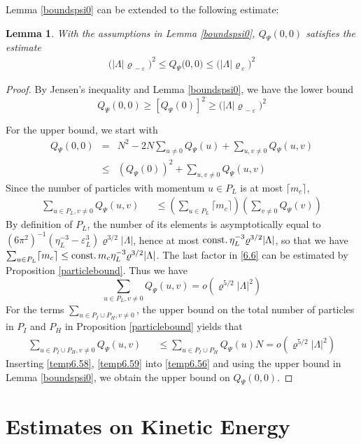 \documentclass[11pt]{article}
\numberwithin{equation}{section}
\newcommand{\beq}{\begin{equation}}
\newcommand{\eeq}{\end{equation}}
\newcommand{\beqa}{\begin{eqnarray}}
\newcommand{\eeqa}{\end{eqnarray}}
\newcommand\eps{\varepsilon}
\newcommand\rhop{\rho_{\,\eps}}
\newcommand\rhom{\rho_{\,-\eps}}
\newcommand\const{{\rm const.\, }}
\renewcommand\rho\varrho
\newtheorem{lem}{Lemma}[section]
\theoremstyle{definition}
\begin{document}
Lemma \ref{boundspsi0} can be extended to the following estimate: 

\begin{lem}\label{boundspsi02}
With the assumptions in Lemma \ref{boundspsi0},  $Q_\Psi(0,0)$ satisfies the estimate
\beqa
\big(|\Lambda|\rhom \big)^2\leq Q_\Psi\big(0, 0 \big)\leq \big(|\Lambda|\rhop\big)^2
\eeqa
\end{lem}


\begin{proof}
By  Jensen's inequality and Lemma \ref{boundspsi0},   we have the lower bound
\[
Q_\Psi(0,0)\geq \left[Q_\Psi(0)\right]^2\geq \big(|\Lambda|\rhom \big)^2
\]

For the upper bound,  we start with  
\beqa\label{temp6.56}
Q_\Psi(0,0)
&= & N^2-2N\sum_{u\neq 0} Q_\Psi(u)+\sum_{u,v\neq 0} Q_\Psi(u,v)\\\nonumber
&\leq & (Q_\Psi(0))^2+\sum_{u,v\neq 0} Q_\Psi(u,v)
\eeqa
Since the number of particles with momentum $u\in P_L$ is at most  $\lceil m_c\rceil$,
\beqa\label{6.6}
\sum_{u\in P_L,v\neq 0} Q_\Psi(u,v) &&\leq\left(\sum_{u\in P_L}\lceil m_c\rceil\right)\left(\sum_{v\neq0}Q_\Psi(v)\right)
\eeqa
By definition of $P_L$, the number of its elements is asymptotically equal to $(6\pi^2)^{-1}(\eta_L^{-3}-\eps_L^3)\rho^{3/2}|\Lambda|$, hence at most $\const\eta_L^{-3}\rho^{3/2}|\Lambda|$, so that we have $\sum_{u\in P_L}\lceil m_c\rceil\leq \const m_c\eta_L^{-3}\rho^{3/2}|\Lambda|$.
The last factor in \eqref{6.6} can be estimated by Proposition \ref{particlebound}. Thus we have
\beq\label{temp6.58}
\sum_{u\in P_L,v\neq 0} Q_\Psi(u,v)=o(\rho^{5/2}|\Lambda|^2)
\eeq
For the terms $\sum_{u\in P_I\cup P_H,v\neq 0}$, 
the upper bound on the total number of particles in $P_I$ and $P_H$ in Proposition \ref{particlebound} yields that 
\beqa\label{temp6.59}
\sum_{u\in P_I\cup P_H,v\neq 0} Q_\Psi(u,v)&&\leq\sum_{u\in P_I\cup P_H} Q_\Psi(u) N =o(\rho^{5/2}|\Lambda|^2)
\eeqa
Inserting \eqref{temp6.58}, \eqref{temp6.59} into  \eqref{temp6.56}
and using the upper bound in Lemma \ref{boundspsi0},  we obtain the upper bound on $Q_\Psi(0,0)$. 
\end{proof}








\section{Estimates on  Kinetic Energy}
\end{document}

